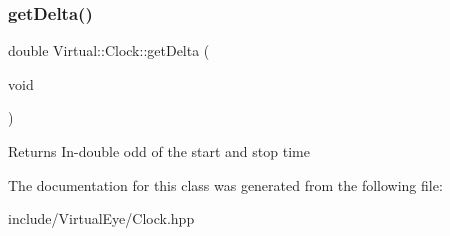 \subsubsection{\texorpdfstring{get\+Delta()}{getDelta()}}
{\footnotesize\ttfamily double Virtual\+::\+Clock\+::get\+Delta (\begin{DoxyParamCaption}\item[{void}]{ }\end{DoxyParamCaption})}

\begin{DoxyReturn}{Returns}
In-\/double odd of the start and stop time 
\end{DoxyReturn}


The documentation for this class was generated from the following file\+:\begin{DoxyCompactItemize}
\item 
include/\+Virtual\+Eye/Clock.\+hpp\end{DoxyCompactItemize}
